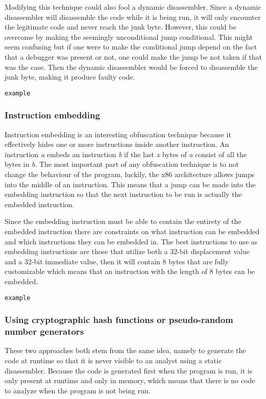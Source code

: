 \documentclass[11pt,twoside]{eitExjobb}
\begin{document}
Modifying this technique could also fool a dynamic disassembler. Since a dynamic disassembler will disassemble the code while it is being run, it will only encounter the legitimate code and never reach the junk byte. However, this could be overcome by making the seemingly unconditional jump conditional. This might seem confusing but if one were to make the conditional jump depend on the fact that a debugger was present or not, one could make the jump be not taken if that was the case. Then the dynamic disassembler would be forced to disassemble the junk byte, making it produce faulty code.

\begin{verbatim}
example
\end{verbatim}

\subsubsection{Instruction embedding}
Instruction embedding\cite{instructionembedding} is an interesting obfuscation technique because it effectively hides one or more instructions inside another instruction. An instruction \emph{a} embeds an instruction \emph{b} if the last \emph{x} bytes of \emph{a} consist of all the bytes in \emph{b}. The most important part of any obfuscation technique is to not change the behaviour of the program, luckily, the x86 architecture allows jumps into the middle of an instruction. This means that a jump can be made into the embedding instruction so that the next instruction to be run is actually the embedded instruction.

Since the embedding instruction must be able to contain the entirety of the embedded instruction there are constraints on what instruction can be embedded and which instructions they can be embedded in. The best instructions to use as embedding instructions are those that utilize both a 32-bit displacement value and a 32-bit immediate value, then it will contain 8 bytes that are fully customizable which means that an instruction with the length of 8 bytes can be embedded.

\begin{verbatim}
example
\end{verbatim}



\subsubsection{Using cryptographic hash functions or pseudo-random number generators}
These two approaches both stem from the same idea, namely to generate the code at runtime so that it is never visible to an analyst using a static disassembler. Because the code is generated first when the program is run, it is only present at runtime and only in memory, which means that there is no code to analyze when the program is not being run.
\end{document}
